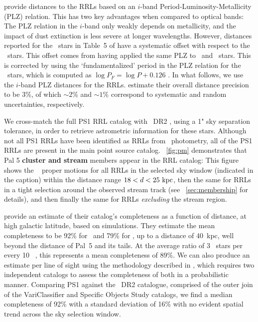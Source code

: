 \documentclass[twocolumn]{aastex63}
\newcommand{\changes}[1]{{\textbf{#1}}}
\begin{document}
\citet{Sesar:2017b} provide distances to the RRLs based on an $i$-band Period-Luminosity-Metallicity (PLZ) relation.
This has two key advantages when compared to optical bands: The PLZ relation in the $i$-band only weakly depends on metallicity, and the impact of dust extinction is less severe at longer wavelengths.
However, distances reported for the \rrc~stars in Table~5 of \citet{Sesar:2017b} have a systematic offset with respect to the \typeab~stars.
This offset comes from having applied the same PLZ to \typeab~and \typec~stars.
This is corrected by using the `fundamentalized' period in the PLZ relation for the \rrc~stars, which is computed as $\log{P_F} = \log P + 0.126$ \citep[following][]{Braga2016}.
In what follows, we use the $i$-band PLZ distances for the RRLs.
\citet{Sesar:2017b} estimate their overall distance precision to be 3\%, of which $\sim2$\% and $\sim1$\% correspond to systematic and random uncertainties, respectively.

We cross-match the full PS1 RRL catalog with \Gaia~DR2 \citep{Gaia:2018}, using a 1" sky separation tolerance, in order to retrieve astrometric information for these stars.
Although not all PS1 RRLs have been identified as RRLs from \Gaia\ photometry, all of the PS1 RRLs are present in the main point source catalog.
\figurename~\ref{fig:pm} demonstrates that Pal 5 \changes{cluster and stream} members appear in the RRL catalog: This figure shows the \Gaia\  proper motions for all RRLs in the selected sky window (indicated in the caption) within the distance range $18 < d < 25~\mathrm{kpc}$, then the same for RRLs in a tight selection around the observed stream track (see \sectionname~\ref{sec:membership} for details), and then finally the same for RRLs \emph{excluding} the stream region.

\citet{Sesar:2017b} provide an estimate of their catalog's completeness as a function of distance, at high galactic latitude, based on simulations. They estimate the mean completeness to be 92\% for \rrab~and 79\% for \rrc, up to a distance of 40~kpc, well beyond the distance of Pal~5 and its tails. At the average ratio of 3 \rrc~stars per every 10 \rrab~\citep{Layden:1995}, this represents a mean completeness of 89\%. We can also produce an estimate per line of sight using the methodology described in \citet{Rybizki:2018}, which requires two independent catalogs to assess the completeness of both in a probabilistic manner. Comparing PS1 against the \Gaia~DR2 catalogue, comprised of the outer join of the VariClassifier \citep{Holl2018,Rimoldini2018} and Specific Objects Study \citep{Clementini2018} catalogs, we find a median completeness of 92\% with a standard deviation of 16\% with no evident spatial trend across the sky selection window.
\end{document}

